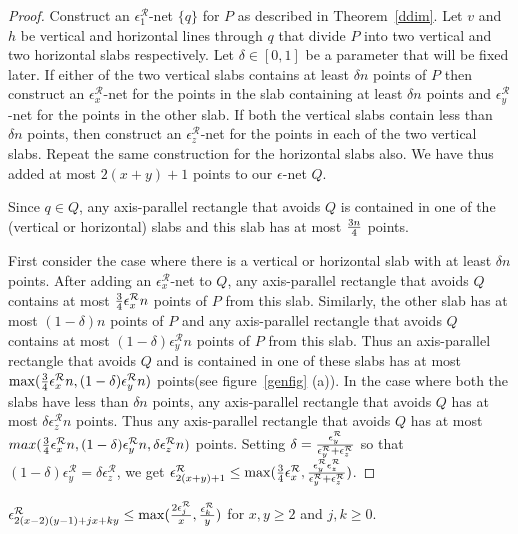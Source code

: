 \begin{proof}
Construct an $\epsilon_1^\mathcal{R}$-net $\{q\}$ for $P$ as described in 
Theorem~\ref{ddim}. Let $v$ and $h$ be vertical and horizontal lines through $q$ that divide $P$ into two vertical and two horizontal slabs respectively. Let $\delta \in [0,1]$ be a parameter that will be fixed later. If either of the two vertical slabs contains at least $\delta n$ points of
$P$ then construct an $\epsilon_x^\mathcal{R}$-net for the points in the slab containing at least $\delta n$ points
and $\epsilon_y^\mathcal{R} $-net for the points in the other slab. If both the vertical 
slabs contain less than $\delta n$ points, then construct an
$\epsilon_z^\mathcal{R}$-net for the points in each of the two vertical slabs. Repeat the same
construction for the horizontal slabs also. We have thus added at most
$2(x+y)+1$ points to our $\epsilon$-net $Q$.


Since $q\in Q$, any
axis-parallel rectangle that avoids $Q$ is contained in one of the 
(vertical or horizontal) slabs and this slab has at most ${3n\over4}$ points.

First consider the case where there is a vertical or horizontal slab with at least $\delta n$ points.
 After adding an $\epsilon_x^\mathcal{R}$-net to
$Q$,  any axis-parallel rectangle that avoids $Q$ contains at most
${3\over4}\epsilon_x^\mathcal{R}n$ points of $P$ from this slab. Similarly,
the other slab has at most $(1-\delta) n$ points of $P$ and any
axis-parallel rectangle that avoids $Q$ contains at most
$(1-\delta)\epsilon_y^\mathcal{R}n$ points of $P$ from this slab. Thus an
axis-parallel rectangle that avoids $Q$ and is contained in  one of these slabs
has at most $\max({3\over4}\epsilon_x^\mathcal{R}n,
(1-\delta)\epsilon_y^\mathcal{R}n )$ points(see figure~\ref{genfig} (a)). In the
case where both the slabs have less than $\delta n$ points, any
axis-parallel rectangle that avoids $Q$ has at most $\delta
\epsilon_z^\mathcal{R}n$ points. Thus any axis-parallel rectangle that avoids $Q$ has at most $max({3\over4}\epsilon_x^\mathcal{R}n, (1-\delta)\epsilon_y^\mathcal{R}n,
\delta \epsilon_z^\mathcal{R}n)$ points. Setting $\delta=
{{\epsilon_y^\mathcal{R}}\over{\epsilon_y^\mathcal{R}
+\epsilon_z^\mathcal{R}}}$ so that $(1-\delta)\epsilon_y^\mathcal{R}=\delta \epsilon_z^\mathcal{R}$, we get $\epsilon_{2(x+y)+1}^\mathcal{R} \leq
\max({{3\over{4}}\epsilon_x^\mathcal{R}},{{\epsilon_y^\mathcal{R}
\epsilon_z^\mathcal{R}}\over{\epsilon_y^\mathcal{R}+\epsilon_z^\mathcal{R}}})$.
\end{proof}
\begin{thm}\label{grid}
$\epsilon_{2(x-2)(y-1)+jx+ky}^\mathcal{R} \leq
\max({{{2\epsilon_j^{\mathcal{R}}} \over{x}},{{\epsilon_{k}^{\mathcal{R}}} \over
{y}}})$ for $x,y \geq 2$ and $j,k\geq 0$.
\end{thm}
